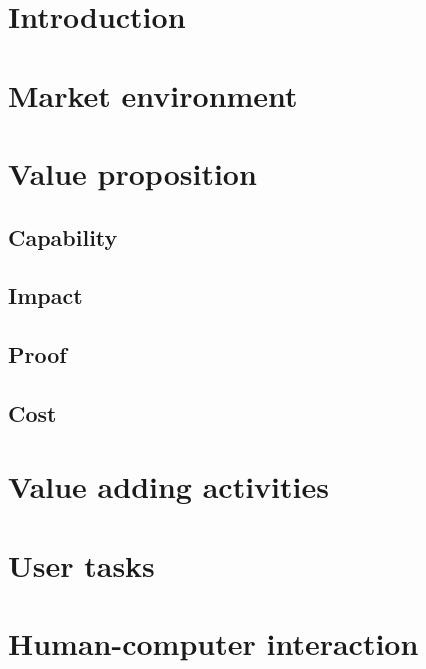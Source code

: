 \documentclass[a4paper,11pt,fleqn,dvipsnames,oneside,openright]{memoir}
\begin{document}
\newpage
\tableofcontents*
\thispagestyle{empty}

\mainmatter 

\chapter{Introduction}


\chapter{Market environment}
\label{Market}


\chapter{Value proposition}
\label{ValueProposition}

\section{Capability}

\section{Impact}

\section{Proof}

\section{Cost}
\label{Cost}


\chapter{Value adding activities}


\chapter{User tasks}


\chapter{Human-computer interaction}
\label{HCI}

\end{document}
